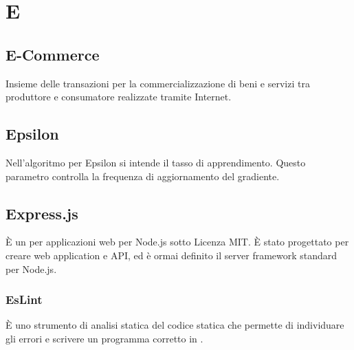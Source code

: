 \section*{E}
\markright{}

\subsection*{E-Commerce}
Insieme delle transazioni per la commercializzazione di beni e servizi tra produttore e consumatore realizzate tramite Internet.

\subsection*{Epsilon}
Nell'algoritmo  per Epsilon si intende il tasso di apprendimento. Questo parametro controlla la frequenza di aggiornamento del gradiente.

\subsection*{Express.js}
È un   per applicazioni web per Node.js sotto Licenza MIT. È stato progettato per creare web application e API, ed è ormai definito il server framework standard per Node.js.

\subsubsection*{EsLint} 
È uno strumento di analisi statica del codice statica che permette di individuare gli errori e scrivere un programma corretto in .   
